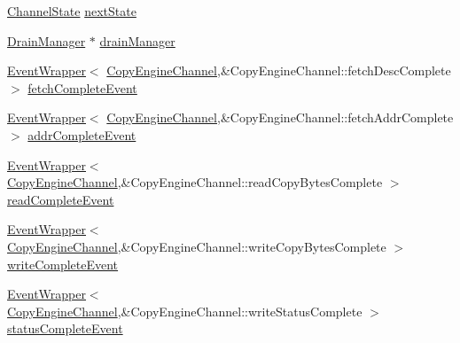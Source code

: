 \begin{DoxyCompactItemize}
\item 
\hyperlink{classCopyEngine_1_1CopyEngineChannel_ac41ef28e0083b7345bf0f53f33934a73}{ChannelState} \hyperlink{classCopyEngine_1_1CopyEngineChannel_ab24b7ded83b7736b1f4f707b95109e5d}{nextState}
\item 
\hyperlink{classDrainManager}{DrainManager} $\ast$ \hyperlink{classCopyEngine_1_1CopyEngineChannel_a329b71fb934a93312ca0aacbf5a3f982}{drainManager}
\item 
\hyperlink{classEventWrapper}{EventWrapper}$<$ \hyperlink{classCopyEngine_1_1CopyEngineChannel}{CopyEngineChannel},\&CopyEngineChannel::fetchDescComplete $>$ \hyperlink{classCopyEngine_1_1CopyEngineChannel_a1534deeb56a4db6a811c7c5b42c192ca}{fetchCompleteEvent}
\item 
\hyperlink{classEventWrapper}{EventWrapper}$<$ \hyperlink{classCopyEngine_1_1CopyEngineChannel}{CopyEngineChannel},\&CopyEngineChannel::fetchAddrComplete $>$ \hyperlink{classCopyEngine_1_1CopyEngineChannel_a8d993ab6d140cbb64e18dd8e6e24fcc2}{addrCompleteEvent}
\item 
\hyperlink{classEventWrapper}{EventWrapper}$<$ \hyperlink{classCopyEngine_1_1CopyEngineChannel}{CopyEngineChannel},\&CopyEngineChannel::readCopyBytesComplete $>$ \hyperlink{classCopyEngine_1_1CopyEngineChannel_aa23ca1b4c066edc88d3770f275f1b250}{readCompleteEvent}
\item 
\hyperlink{classEventWrapper}{EventWrapper}$<$ \hyperlink{classCopyEngine_1_1CopyEngineChannel}{CopyEngineChannel},\&CopyEngineChannel::writeCopyBytesComplete $>$ \hyperlink{classCopyEngine_1_1CopyEngineChannel_a1008f08d5b6c9e1e72e6736909f23bbb}{writeCompleteEvent}
\item 
\hyperlink{classEventWrapper}{EventWrapper}$<$ \hyperlink{classCopyEngine_1_1CopyEngineChannel}{CopyEngineChannel},\&CopyEngineChannel::writeStatusComplete $>$ \hyperlink{classCopyEngine_1_1CopyEngineChannel_a311433f834e73820b65afccaadc60cf3}{statusCompleteEvent}
\end{DoxyCompactItemize}


